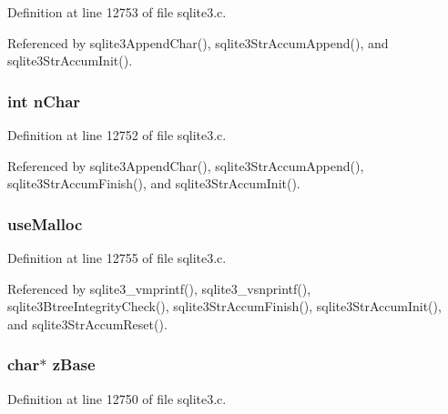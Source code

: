 Definition at line 12753 of file sqlite3.\+c.



Referenced by sqlite3\+Append\+Char(), sqlite3\+Str\+Accum\+Append(), and sqlite3\+Str\+Accum\+Init().

\hypertarget{struct_str_accum_a3b4b4c05c7ab6c41b9cdf4e8bac74270}{}
\subsubsection[{n\+Char}]{\setlength{\rightskip}{0pt plus 5cm}int n\+Char}\label{struct_str_accum_a3b4b4c05c7ab6c41b9cdf4e8bac74270}


Definition at line 12752 of file sqlite3.\+c.



Referenced by sqlite3\+Append\+Char(), sqlite3\+Str\+Accum\+Append(), sqlite3\+Str\+Accum\+Finish(), and sqlite3\+Str\+Accum\+Init().

\hypertarget{struct_str_accum_a68041f06bab26b9fecf18e56febbf150}{}
\subsubsection[{use\+Malloc}]{ use\+Malloc}\label{struct_str_accum_a68041f06bab26b9fecf18e56febbf150}


Definition at line 12755 of file sqlite3.\+c.



Referenced by sqlite3\+\_\+vmprintf(), sqlite3\+\_\+vsnprintf(), sqlite3\+Btree\+Integrity\+Check(), sqlite3\+Str\+Accum\+Finish(), sqlite3\+Str\+Accum\+Init(), and sqlite3\+Str\+Accum\+Reset().

\hypertarget{struct_str_accum_a73244b7a261f7cc837bf5f73b487e8c3}{}
\subsubsection[{z\+Base}]{\setlength{\rightskip}{0pt plus 5cm}char$\ast$ z\+Base}\label{struct_str_accum_a73244b7a261f7cc837bf5f73b487e8c3}


Definition at line 12750 of file sqlite3.\+c.



